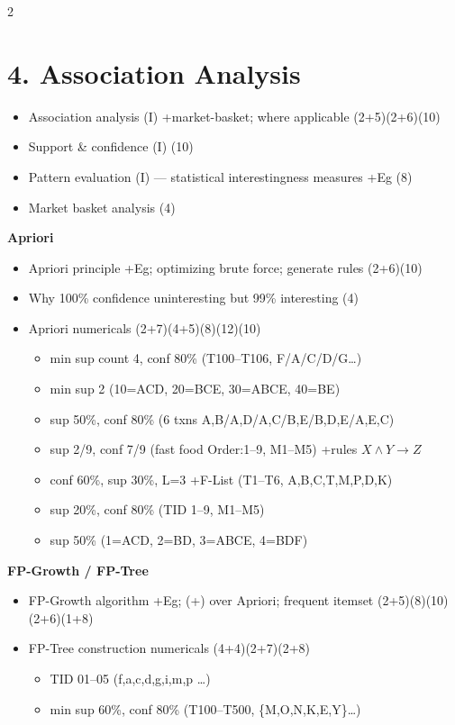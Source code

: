 \documentclass[10pt]{article}
\begin{document}
\begin{multicols}{2}
\section*{4. Association Analysis}
\begin{itemize}
  \item Association analysis (I) +market-basket; where applicable \hfill (2+5)(2+6)(10)
  \item Support \& confidence (I) \hfill (10)
  \item Pattern evaluation (I) --- statistical interestingness measures +Eg \hfill (8)
  \item Market basket analysis \hfill (4)
\end{itemize}
\textbf{Apriori}
\begin{itemize}
  \item Apriori principle +Eg; optimizing brute force; generate rules \hfill (2+6)(10)
  \item Why 100\% confidence uninteresting but 99\% interesting \hfill (4)
  \item Apriori numericals \hfill (2+7)(4+5)(8)(12)(10)
    \begin{itemize}
      \item min sup count 4, conf 80\% (T100--T106, F/A/C/D/G\dots)
      \item min sup 2 (10=ACD, 20=BCE, 30=ABCE, 40=BE)
      \item sup 50\%, conf 80\% (6 txns A,B/A,D/A,C/B,E/B,D,E/A,E,C)
      \item sup 2/9, conf 7/9 (fast food Order:1--9, M1--M5) +rules $X\wedge Y\to Z$
      \item conf 60\%, sup 30\%, L=3 +F-List (T1--T6, A,B,C,T,M,P,D,K)
      \item sup 20\%, conf 80\% (TID 1--9, M1--M5)
      \item sup 50\% (1=ACD, 2=BD, 3=ABCE, 4=BDF)
    \end{itemize}
\end{itemize}
\textbf{FP-Growth / FP-Tree}
\begin{itemize}
  \item FP-Growth algorithm +Eg; (+) over Apriori; frequent itemset \hfill (2+5)(8)(10)(2+6)(1+8)
  \item FP-Tree construction numericals \hfill (4+4)(2+7)(2+8)
    \begin{itemize}
      \item TID 01--05 (f,a,c,d,g,i,m,p \dots)
      \item min sup 60\%, conf 80\% (T100--T500, \{M,O,N,K,E,Y\}\dots)

\end{itemize}
\end{itemize}
\end{multicols}
\end{document}
